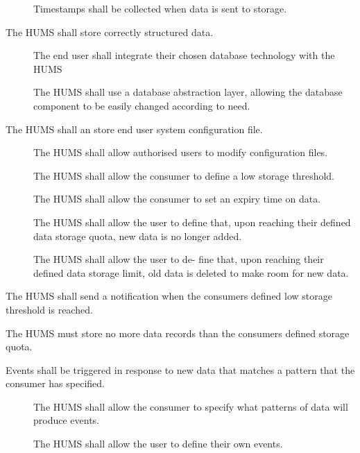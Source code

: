\begin{description}[leftmargin=1.3cm, itemsep=0.3cm]
\begin{description}
 		 \item[] Timestamps shall be collected when data is sent 			to storage.
	\end{description}
	 \item[\fr{3}] The HUMS shall store correctly structured data.
	 \begin{description}
	 	\item[] The end user shall integrate their chosen database 			technology with the HUMS
	 	\item[] The HUMS shall use a database abstraction layer, 			allowing the database component to be easily changed according to 			need.
	  \end{description}
	 \item[\fr{4}] The HUMS shall an store end user system configuration 			file.
	 \begin{description}
	  	\item[] The HUMS shall allow authorised users to modify
 		configuration files. 
		 \item[] The HUMS shall allow the consumer to define a 				low storage threshold.
		  \item[] The HUMS shall allow the consumer to set an expiry 			time on data.
		  \item[]  The HUMS shall allow the user to define that, 				upon reaching their defined data storage quota, new data is no 				longer added.
		 \item[] The HUMS shall allow the user to de- fine that, upon 			reaching their defined data storage limit, old data is deleted to make 			room for new data.
	\end{description}
	 \item[\fr{5}] The HUMS shall send a notification when the consumers 		defined low storage threshold is reached.
	  \item[\fr{6}] The HUMS must store no more data records than the 			consumers defined storage quota.
	\item[\fr{7}]Events shall be triggered in response to new data that 			matches a pattern that the consumer has specified.
	  \begin{description}
	  
		 \item[]  The HUMS shall allow the consumer to specify what 		 	patterns of data will produce events.
		  
		 \item[] The HUMS shall allow the user to define their
 		own events.
		

\end{description}
\end{description}
